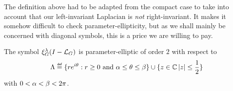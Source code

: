 The definition above had to be adapted from the compact case
to take into account that our left-invariant Laplacian is \emph{not} right-invariant.
It makes it somehow difficult to check parameter-ellipticity,
but as we shall mainly be concerned with diagonal symbols,
this is a price we are willing to pay.

\begin{example}
    The symbol $\xi^{\lambda}_{G} (I - {\mathcal{L}_{G}})^{}$ is parameter-elliptic of order $2$ with respect to
    \begin{align*}
        \Lambda \defeq \{r \e^{\i \theta} : r \geq 0 \text{ and } \alpha \leq \theta \leq \beta \} \cup \{z \in \C \abs z \leq \frac 1 2  \}
    \end{align*}
    with $0 < \alpha < \beta < 2 \pi$.
\end{example}

